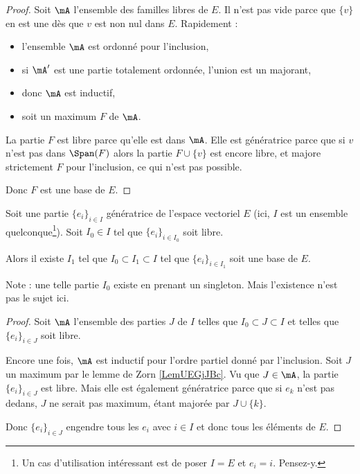 \begin{proof}
    Soit \( \mA\) l'ensemble des familles libres de \( E\). Il n'est pas vide parce que \( \{ v \}\) en est une dès que \( v\) est non nul dans \( E\). Rapidement :
    \begin{itemize}
        \item l'ensemble \( \mA\) est ordonné pour l'inclusion,
        \item si \( \mA'\) est une partie totalement ordonnée, l'union est un majorant,
        \item donc \( \mA\) est inductif,
        \item soit un maximum \( F\) de \( \mA\).
    \end{itemize}
    La partie \( F\) est libre parce qu'elle est dans \( \mA\). Elle est génératrice parce que si \( v\) n'est pas dans \( \Span(F)\) alors la partie \( F\cup\{ v \}\) est encore libre, et majore strictement $F$ pour l'inclusion, ce qui n'est pas possible.

    Donc \( F\) est une base de \( E\).
\end{proof}

\begin{theorem}      \label{THOooOQLQooHqEeDK}
    Soit une partie \( \{ e_i \}_{i\in I}\) génératrice de l'espace vectoriel \( E\) (ici, \( I\) est un ensemble quelconque\footnote{Un cas d'utilisation intéressant est de poser \( I=E\) et \( e_i=i\). Pensez-y.}). Soit \( I_0\in I\) tel que \( \{ e_i \}_{i\in I_0}\) soit libre.

    Alors il existe \( I_1\) tel que \( I_0\subset I_1\subset I\) tel que \( \{ e_i \}_{i\in I_1}\) soit une base de \( E\).
\end{theorem}

Note : une telle partie \( I_0\) existe en prenant un singleton. Mais l'existence n'est pas le sujet ici.

\begin{proof}
    Soit \( \mA\) l'ensemble des parties \( J\) de \( I\) telles que \( I_0\subset J\subset I\) et telles que \( \{ e_i \}_{i\in J}\) soit libre.

    Encore une fois, \( \mA\) est inductif pour l'ordre partiel donné par l'inclusion. Soit \( J\) un maximum par le lemme de Zorn \ref{LemUEGjJBc}. Vu que \( J\in\mA\), la partie \( \{ e_i \}_{i\in J}\) est libre. Mais elle est également génératrice parce que si \( e_k\) n'est pas dedans, \( J\) ne serait pas maximum, étant majorée par \( J\cup\{ k \}\).

    Donc \( \{ e_i \}_{i\in J}\) engendre tous les \( e_i\) avec \( i\in I\) et donc tous les éléments de \( E\).
\end{proof}

